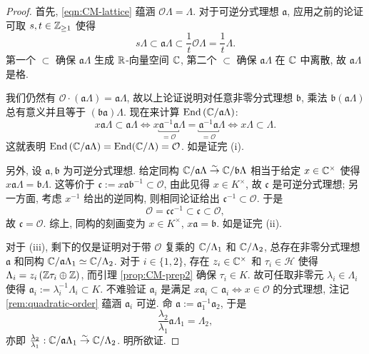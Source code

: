 \begin{proof}
	首先, \eqref{eqn:CM-lattice} 蕴涵 $\mathcal{O} \Lambda = \Lambda$. 对于可逆分式理想 $\mathfrak{a}$, 应用之前的论证可取 $s, t \in \mathbb{Z}_{\geq 1}$ 使得
	\[ s\Lambda \subset \mathfrak{a}\Lambda \subset \frac{1}{t} \mathcal{O} \Lambda = \frac{1}{t} \Lambda. \]
	第一个 $\subset$ 确保 $\mathfrak{a}\Lambda$ 生成 $\mathbb{R}$-向量空间 $\mathbb{C}$, 第二个 $\subset$ 确保 $\mathfrak{a}\Lambda$ 在 $\mathbb{C}$ 中离散, 故 $\mathfrak{a}\Lambda$ 是格.

	我们仍然有 $\mathcal{O} \cdot (\mathfrak{a} \Lambda) = \mathfrak{a}\Lambda$, 故以上论证说明对任意非零分式理想 $\mathfrak{b}$, 乘法 $\mathfrak{b}(\mathfrak{a}\Lambda)$ 总有意义并且等于 $(\mathfrak{b}\mathfrak{a}) \Lambda$. 现在来计算 $\operatorname{End}\left( \mathbb{C}/\mathfrak{a}\Lambda \right)$:
	\[ x\mathfrak{a}\Lambda \subset \mathfrak{a}\Lambda \iff x \underbracket{\mathfrak{a}^{-1}\mathfrak{a}}_{= \mathcal{O}} \Lambda = \underbracket{\mathfrak{a}^{-1}\mathfrak{a}}_{= \mathcal{O}} \Lambda \iff x\Lambda \subset \Lambda. \]
	这就表明 $\operatorname{End}\left( \mathbb{C}/\mathfrak{a}\Lambda \right) = \operatorname{End}(\mathbb{C}/\Lambda) = \mathcal{O}$. 如是证完 (i).
	
	另外, 设 $\mathfrak{a}, \mathfrak{b}$ 为可逆分式理想. 给定同构 $\mathbb{C}/\mathfrak{a}\Lambda \stackrel{\sim}{\rightarrow} \mathbb{C}/\mathfrak{b}\Lambda$ 相当于给定 $x \in \mathbb{C}^\times$ 使得 $x\mathfrak{a}\Lambda = \mathfrak{b}\Lambda$. 这等价于 $\mathfrak{c} := x\mathfrak{a}\mathfrak{b}^{-1} \subset \mathcal{O}$, 由此见得 $x \in K^\times$, 故 $\mathfrak{c}$ 是可逆分式理想; 另一方面, 考虑 $x^{-1}$ 给出的逆同构, 则相同论证给出 $\mathfrak{c}^{-1} \subset \mathcal{O}$. 于是
	\[ \mathcal{O} = \mathfrak{c}\mathfrak{c}^{-1} \subset \mathfrak{c} \subset \mathcal{O}, \]
	故 $\mathfrak{c} = \mathcal{O}$. 综上, 同构的刻画变为 $x \in K^\times$, $x\mathfrak{a} = \mathfrak{b}$. 如是证完 (ii).
	
	对于 (iii), 剩下的仅是证明对于带 $\mathcal{O}$ 复乘的 $\mathbb{C}/\Lambda_1$ 和 $\mathbb{C}/\Lambda_2$, 总存在非零分式理想 $\mathfrak{a}$ 和同构 $\mathbb{C}/\mathfrak{a}\Lambda_1 \simeq \mathbb{C}/\Lambda_2$. 对于 $i \in \{1, 2\}$, 存在 $z_i \in \mathbb{C}^\times$ 和 $\tau_i \in \mathcal{H}$ 使得 $\Lambda_i = z_i \left( \mathbb{Z}\tau_i \oplus \mathbb{Z} \right)$, 而引理 \ref{prop:CM-prep2} 确保 $\tau_i \in K$. 故可任取非零元 $\lambda_i \in \Lambda_i$ 使得 $\mathfrak{a}_i := \lambda_i^{-1}\Lambda_i \subset K$. 不难验证 $\mathfrak{a}_i$ 是满足 $x\mathfrak{a}_i \subset \mathfrak{a}_i \iff x \in \mathcal{O}$ 的分式理想, 注记 \ref{rem:quadratic-order} 蕴涵 $\mathfrak{a}_i$ 可逆. 命 $\mathfrak{a} := \mathfrak{a}_1^{-1} \mathfrak{a}_2$, 于是
	\[ \frac{\lambda_2}{\lambda_1} \mathfrak{a} \Lambda_1 = \Lambda_2, \]
	亦即 $\frac{\lambda_2}{\lambda_1}: \mathbb{C}/\mathfrak{a}\Lambda_1 \stackrel{\sim}{\rightarrow} \mathbb{C}/\Lambda_2$. 明所欲证.
\end{proof}

